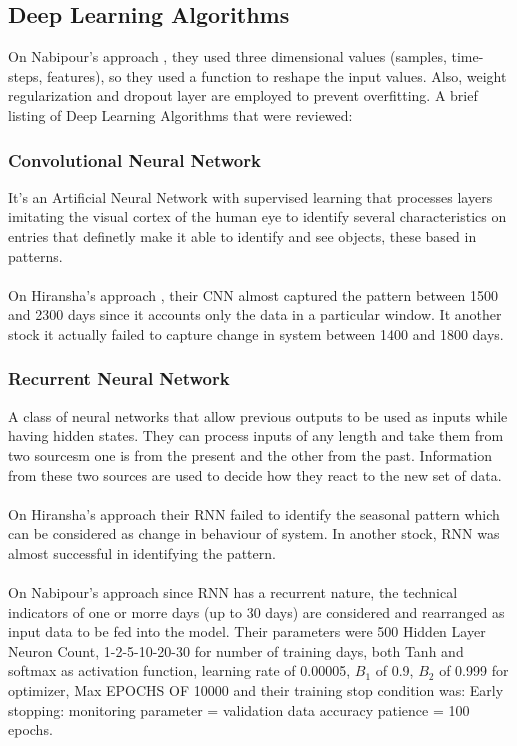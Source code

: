 \documentclass[conference]{IEEEtran}
\begin{document}
\subsection{Deep Learning Algorithms}

On Nabipour's approach \cite{nabipour2020predicting}, they used three dimensional values (samples, time-steps, features), so they used a function to reshape
the input values. Also, weight regularization and dropout layer are employed to prevent overfitting.
A brief listing of Deep Learning Algorithms that were reviewed:

\subsubsection{Convolutional Neural Network}
It's an Artificial Neural Network with supervised learning that processes layers imitating the visual cortex
of the human eye to identify several characteristics on entries that definetly make it able to identify and see objects, these based in patterns.
\\\\
On Hiransha's approach \cite{M2018}, their CNN almost captured the pattern between 1500 and 2300 days since it accounts only the data in a particular window. It another stock it actually failed to capture change in system between 1400 and 1800 days.
\subsubsection{Recurrent Neural Network}
A class of neural networks that allow previous outputs to be used as inputs while having hidden states. They can process inputs of any length and take them from two sourcesm one is from the present
and the other from the past. Information from these two sources are used to decide how they react to the new set of data.
\\\\
On Hiransha's approach \cite{M2018} their RNN failed to identify the seasonal pattern which can be considered as change in behaviour of system. In another stock, RNN was almost successful in 
identifying the pattern.
\\\\
On Nabipour's approach \cite{nabipour2020predicting} since RNN has a recurrent nature, the technical indicators of one or morre days (up to 30 days) are considered and rearranged as input data to be fed into the model. Their parameters were 500 Hidden Layer Neuron Count, 1-2-5-10-20-30 for number of training days, both Tanh and softmax as activation function, learning rate of 0.00005, $B_1$ of 0.9, $B_2$ of 0.999 for optimizer, Max EPOCHS OF 10000 and their training stop condition
was: Early stopping: monitoring parameter = validation data accuracy patience = 100 epochs. 
\\\\
\end{document}

